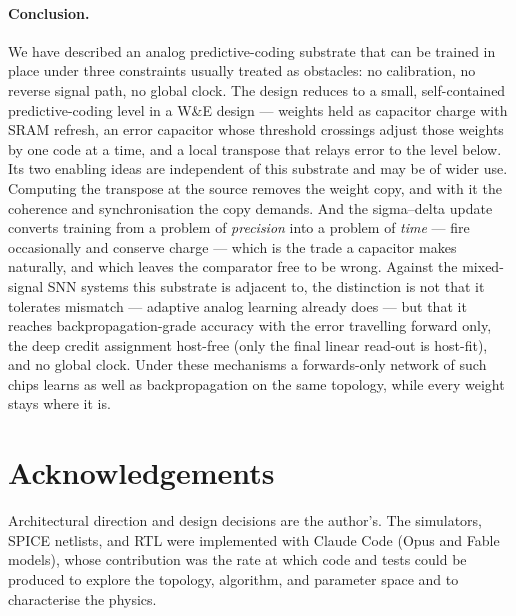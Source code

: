 \documentclass[11pt]{article}
\begin{document}
\hypertarget{conclusion.}{%
\paragraph{Conclusion.}\label{conclusion.}}

We have described an analog predictive-coding substrate that can be
trained in place under three constraints usually treated as obstacles:
no calibration, no reverse signal path, no global clock. The design
reduces to a small, self-contained predictive-coding level in a W\&E
design --- weights held as capacitor charge with SRAM refresh, an error
capacitor whose threshold crossings adjust those weights by one code at
a time, and a local transpose that relays error to the level below. Its
two enabling ideas are independent of this substrate and may be of wider
use. Computing the transpose at the source removes the weight copy, and
with it the coherence and synchronisation the copy demands. And the
sigma--delta update converts training from a problem of \emph{precision}
into a problem of \emph{time} --- fire occasionally and conserve charge
--- which is the trade a capacitor makes naturally, and which leaves the
comparator free to be wrong. Against the mixed-signal SNN systems this
substrate is adjacent to, the distinction is not that it tolerates
mismatch --- adaptive analog learning already does --- but that it
reaches backpropagation-grade accuracy with the error travelling forward
only, the deep credit assignment host-free (only the final linear
read-out is host-fit), and no global clock. Under these mechanisms a
forwards-only network of such chips learns as well as backpropagation on
the same topology, while every weight stays where it is.

\hypertarget{acknowledgements}{%
\section*{Acknowledgements}\label{acknowledgements}}

Architectural direction and design decisions are the author's. The
simulators, SPICE netlists, and RTL were implemented with Claude Code
\cite{anthropic2025claudecode} (Opus and Fable models), whose
contribution was the rate at which code and tests could be produced to
explore the topology, algorithm, and parameter space and to characterise
the physics.




\end{document}
